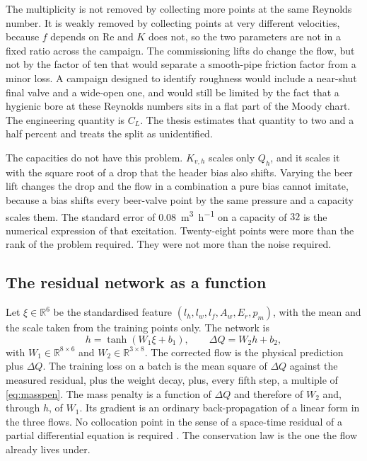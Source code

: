The multiplicity is not removed by collecting more points at the same Reynolds number. It is weakly removed by collecting points at very different velocities, because $f$ depends on $\mathrm{Re}$ and $K$ does not, so the two parameters are not in a fixed ratio across the campaign. The commissioning lifts do change the flow, but not by the factor of ten that would separate a smooth-pipe friction factor from a minor loss. A campaign designed to identify roughness would include a near-shut final valve and a wide-open one, and would still be limited by the fact that a hygienic bore at these Reynolds numbers sits in a flat part of the Moody chart. The engineering quantity is $C_L$. The thesis estimates that quantity to two and a half percent and treats the split as unidentified.

The capacities do not have this problem. $K_{v,h}$ scales only $Q_h$, and it scales it with the square root of a drop that the header bias also shifts. Varying the beer lift changes the drop and the flow in a combination a pure bias cannot imitate, because a bias shifts every beer-valve point by the same pressure and a capacity scales them. The standard error of \SI{0.08}{\cubic\metre\per\hour} on a capacity of $32$ is the numerical expression of that excitation. Twenty-eight points were more than the rank of the problem required. They were not more than the noise required.

\subsection{The residual network as a function}
\label{sec:netfun}

Let $\xi\in\mathbb{R}^{6}$ be the standardised feature $(l_h,l_w,l_f,A_w,E_r,p_m)$, with the mean and the scale taken from the training points only. The network is
\begin{equation}
\label{eq:net}
h = \tanh(W_1\xi + b_1),
\qquad
\Delta Q = W_2 h + b_2,
\end{equation}
with $W_1\in\mathbb{R}^{8\times 6}$ and $W_2\in\mathbb{R}^{3\times 8}$. The corrected flow is the physical prediction plus $\Delta Q$. The training loss on a batch is the mean square of $\Delta Q$ against the measured residual, plus the weight decay, plus, every fifth step, a multiple of \eqref{eq:masspen}. The mass penalty is a function of $\Delta Q$ and therefore of $W_2$ and, through $h$, of $W_1$. Its gradient is an ordinary back-propagation of a linear form in the three flows. No collocation point in the sense of a space-time residual of a partial differential equation is required \citep{raissi2019}. The conservation law is the one the flow already lives under.

